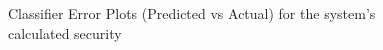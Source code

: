 \begin{figure}
        \centering
        \caption{Classifier Error Plots (Predicted vs Actual) for the system's calculated security}\label{fig:ml:classifier_errors} 
    \end{figure}


